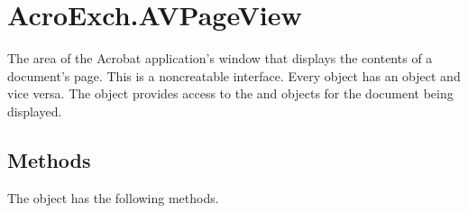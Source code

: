 \documentclass[letterpaper,12pt,english,openany,oneside]{sphinxmanual}
\begin{document}
\section{AcroExch.AVPageView}
\label{\detokenize{IAC_API_OLE_Objects:acroexch-avpageview}}
The area of the Acrobat application’s window that displays the contents of a document’s page. This is a non\sphinxhyphen{}creatable interface. Every  object has an  object and vice versa. The object provides access to the  and  objects for the document being displayed.


\subsection{Methods}
\label{\detokenize{IAC_API_OLE_Objects:methods-2}}\label{\detokenize{IAC_API_OLE_Objects:id5}}
The  object has the following methods.
\end{document}

